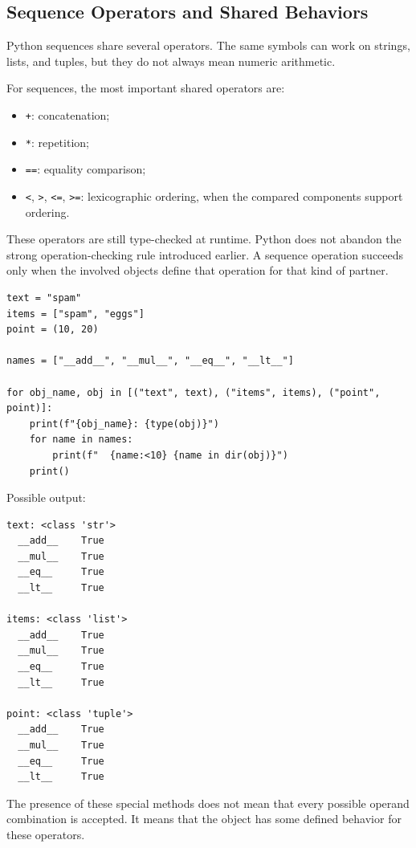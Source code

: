 \subsection{Sequence Operators and Shared Behaviors}

Python sequences share several operators. The same symbols can work on strings, lists, and tuples, but they do not always mean numeric arithmetic.

For sequences, the most important shared operators are:

\begin{itemize}
    \item \texttt{+}: concatenation;
    \item \texttt{*}: repetition;
    \item \texttt{==}: equality comparison;
    \item \texttt{<}, \texttt{>}, \texttt{<=}, \texttt{>=}: lexicographic ordering, when the compared components support ordering.
\end{itemize}

These operators are still type-checked at runtime. Python does not abandon the strong operation-checking rule introduced earlier. A sequence operation succeeds only when the involved objects define that operation for that kind of partner.

\begin{verbatim}
text = "spam"
items = ["spam", "eggs"]
point = (10, 20)

names = ["__add__", "__mul__", "__eq__", "__lt__"]

for obj_name, obj in [("text", text), ("items", items), ("point", point)]:
    print(f"{obj_name}: {type(obj)}")
    for name in names:
        print(f"  {name:<10} {name in dir(obj)}")
    print()
\end{verbatim}

Possible output:

\begin{verbatim}
text: <class 'str'>
  __add__    True
  __mul__    True
  __eq__     True
  __lt__     True

items: <class 'list'>
  __add__    True
  __mul__    True
  __eq__     True
  __lt__     True

point: <class 'tuple'>
  __add__    True
  __mul__    True
  __eq__     True
  __lt__     True
\end{verbatim}

The presence of these special methods does not mean that every possible operand combination is accepted. It means that the object has some defined behavior for these operators.


